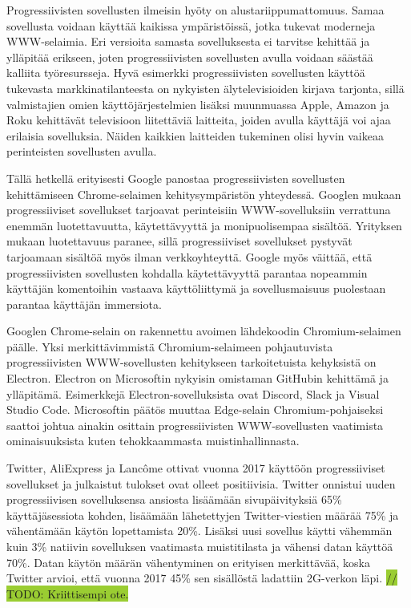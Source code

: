 \documentclass[utf8]{gradu3}
\begin{document}
Progressiivisten sovellusten ilmeisin hyöty on alustariippumattomuus. Samaa sovellusta voidaan käyttää kaikissa ympäristöissä, jotka tukevat moderneja WWW-selaimia. Eri versioita samasta sovelluksesta ei tarvitse kehittää ja ylläpitää erikseen, joten progressiivisten sovellusten avulla voidaan säästää kalliita työresursseja. Hyvä esimerkki progressiivisten sovellusten käyttöä tukevasta markkinatilanteesta on nykyisten älytelevisioiden kirjava tarjonta, sillä valmistajien omien käyttöjärjestelmien lisäksi muunmuassa Apple, Amazon ja Roku kehittävät televisioon liitettäviä laitteita, joiden avulla käyttäjä voi ajaa erilaisia sovelluksia. Näiden kaikkien laitteiden tukeminen olisi hyvin vaikeaa perinteisten sovellusten avulla. \parencite[]{frankston-pwa}

Tällä hetkellä erityisesti Google panostaa progressiivisten sovellusten kehittämiseen Chrome-selaimen kehitysympäristön yhteydessä. Googlen \parencite[]{google-pwa-marketing} mukaan progressiiviset sovellukset tarjoavat perinteisiin WWW-sovelluksiin verrattuna enemmän luotettavuutta, käytettävyyttä ja monipuolisempaa sisältöä. Yrityksen mukaan luotettavuus paranee, sillä progressiiviset sovellukset pystyvät tarjoamaan sisältöä myös ilman verkkoyhteyttä. Google myös väittää, että progressiivisten sovellusten kohdalla käytettävyyttä parantaa nopeammin käyttäjän komentoihin vastaava käyttöliittymä ja sovellusmaisuus puolestaan parantaa käyttäjän immersiota.

Googlen Chrome-selain on rakennettu avoimen lähdekoodin Chromium-selaimen päälle. Yksi merkittävimmistä Chromium-selaimeen pohjautuvista progressiivisten WWW-sovellusten kehitykseen tarkoitetuista kehyksistä on Electron. Electron on Microsoftin nykyisin omistaman GitHubin kehittämä ja ylläpitämä. Esimerkkejä Electron-sovelluksista ovat Discord, Slack ja Visual Studio Code. Microsoftin päätös muuttaa Edge-selain Chromium-pohjaiseksi saattoi johtua ainakin osittain progressiivisten WWW-sovellusten vaatimista ominaisuuksista kuten tehokkaammasta muistinhallinnasta.

Twitter, AliExpress ja Lancôme ottivat vuonna 2017 käyttöön progressiiviset sovellukset ja julkaistut tulokset ovat olleet positiivisia. Twitter onnistui uuden progressiivisen sovelluksensa ansiosta lisäämään sivupäivityksiä 65\% käyttäjäsessiota kohden, lisäämään lähetettyjen Twitter-viestien määrää 75\% ja vähentämään käytön lopettamista 20\%. Lisäksi uusi sovellus käytti vähemmän kuin 3\% natiivin sovelluksen vaatimasta muistitilasta ja vähensi datan käyttöä 70\%. Datan käytön määrän vähentyminen on erityisen merkittävää, koska Twitter arvioi, että vuonna 2017 45\% sen sisällöstä ladattiin 2G-verkon läpi. \parencite[]{beginners-guide-pwa}   
\colorbox{YellowGreen}{// TODO: Kriittisempi ote.}
\end{document}
